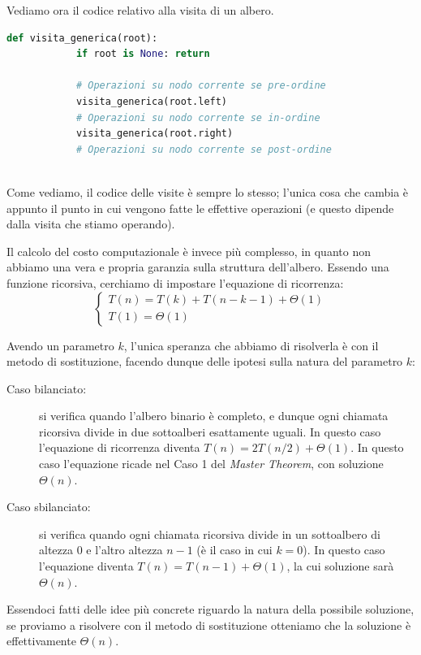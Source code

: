 \documentclass[12pt]{report}
\begin{document}
	Vediamo ora il codice relativo alla visita di un albero.
	
	\begin{lstlisting}[language=Python, caption={Algoritmo generico di visita di un albero}]
		def visita_generica(root):
			if root is None: return
			
			# Operazioni su nodo corrente se pre-ordine
			visita_generica(root.left)
			# Operazioni su nodo corrente se in-ordine
			visita_generica(root.right)
			# Operazioni su nodo corrente se post-ordine
			
	\end{lstlisting}
	
	Come vediamo, il codice delle visite è sempre lo stesso; l'unica cosa che cambia è appunto il punto in cui vengono fatte le effettive operazioni (e questo dipende dalla visita che stiamo operando).
	
	Il calcolo del costo computazionale è invece più complesso, in quanto non abbiamo una vera e propria garanzia sulla struttura dell'albero. Essendo una funzione ricorsiva, cerchiamo di impostare l'equazione di ricorrenza:
	\[
	\begin{cases}
		T(n) = T(k) + T(n - k - 1) + \Theta(1) \\
		T(1) = \Theta(1)
	\end{cases}
	\]
	
	Avendo un parametro $k$, l'unica speranza che abbiamo di risolverla è con il metodo di sostituzione, facendo dunque delle ipotesi sulla natura del parametro $k$:
	\begin{description}
		\item[Caso bilanciato:] si verifica quando l'albero binario è completo, e dunque ogni chiamata ricorsiva divide in due sottoalberi esattamente uguali. In questo caso l'equazione di ricorrenza diventa $T(n) = 2T(n/2) + \Theta(1)$. In questo caso l'equazione ricade nel Caso 1 del \textit{Master Theorem}, con soluzione $\Theta(n)$.
		\item[Caso sbilanciato:] si verifica quando ogni chiamata ricorsiva divide in un sottoalbero di altezza $0$ e l'altro altezza $n-1$ (è il caso in cui $k = 0$). In questo caso l'equazione diventa $T(n) = T(n-1) + \Theta(1)$, la cui soluzione sarà $\Theta(n)$.
	\end{description}
	
	Essendoci fatti delle idee più concrete riguardo la natura della possibile soluzione, se proviamo a risolvere con il metodo di sostituzione otteniamo che la soluzione è effettivamente $\Theta(n)$.
	
\end{document}
